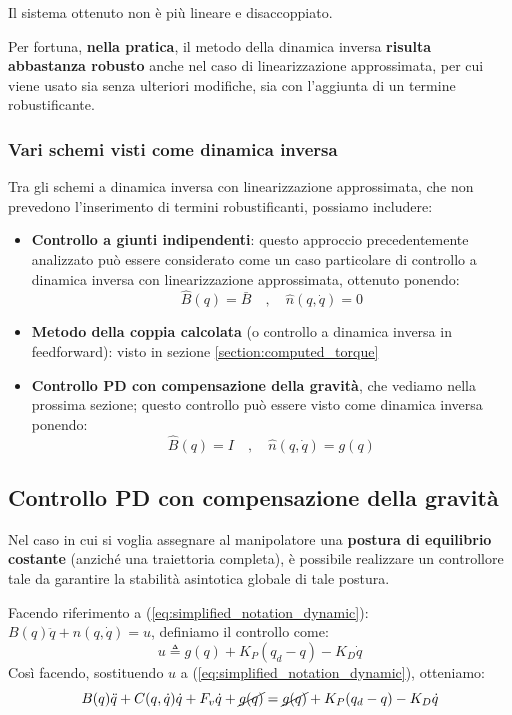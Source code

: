 Il sistema ottenuto non è più lineare e disaccoppiato.

Per fortuna, \textbf{nella pratica}, il metodo della dinamica inversa \textbf{risulta abbastanza robusto} anche nel caso di linearizzazione approssimata, per cui viene usato sia senza ulteriori modifiche, sia con l’aggiunta di un termine robustificante.\\

\vspace*{5pt}
\subsubsection{Vari schemi visti come dinamica inversa}
Tra gli schemi a dinamica inversa con linearizzazione approssimata, che non prevedono l’inserimento di termini robustificanti, possiamo includere:
\begin{itemize}
	\item \textbf{Controllo a giunti indipendenti}: questo approccio precedentemente analizzato può essere considerato come un caso particolare di controllo a dinamica inversa con linearizzazione approssimata, ottenuto ponendo:
	$$
	\hat{B}(q) = \bar{B} \quad , \quad \hat{n}(q, \dot{q}) = 0
	$$
	\item \textbf{Metodo della coppia calcolata} (o controllo a dinamica inversa in feedforward): visto in sezione \ref{section:computed_torque}
	\item \textbf{Controllo PD con compensazione della gravità}, che vediamo nella prossima sezione; questo controllo può essere visto come dinamica inversa ponendo:
	$$
	\hat{B}(q) = I \quad , \quad \hat{n}(q, \dot{q}) = g(q)
	$$
\end{itemize}
\unboldmath








\vspace*{7pt}
\subsection{Controllo PD con compensazione della gravità}

Nel caso in cui si voglia assegnare al manipolatore una \textbf{postura di equilibrio costante} (anziché una traiettoria completa), è possibile realizzare un controllore tale da garantire la stabilità asintotica globale di tale postura.

\boldmath
Facendo riferimento a (\ref{eq:simplified_notation_dynamic}): $B(q)\ddot{q} + n(q, \dot{q}) = u$, definiamo il controllo come:
$$
u \triangleq g(q) + K_P(q_d - q) - K_D\dot{q}
$$
Così facendo, sostituendo $u$ a (\ref{eq:simplified_notation_dynamic}), otteniamo:
\begin{equation}\label{eq:pd_gravity_comp_dyn}
B(q)\ddot{q} + C(q, \dot{q})\dot{q} + F_v\dot{q} + \cancel{g(q)} = \cancel{g(q)} + K_P(q_d - q) - K_D\dot{q}
\end{equation}

